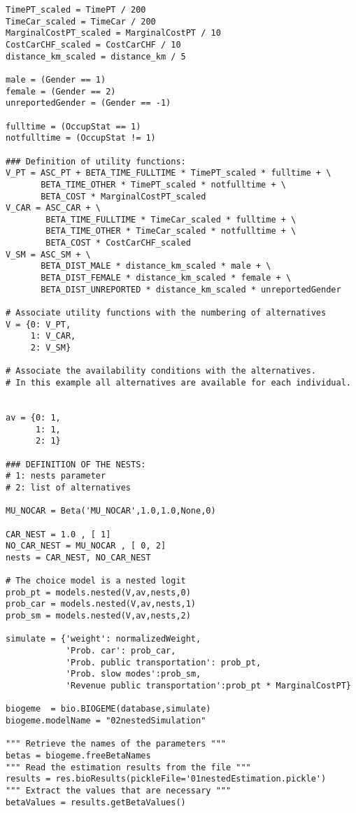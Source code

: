 \documentclass[12pt,a4paper]{article}
\begin{document}
\begin{lstlisting}[style=numbers]
TimePT_scaled = TimePT / 200
TimeCar_scaled = TimeCar / 200
MarginalCostPT_scaled = MarginalCostPT / 10
CostCarCHF_scaled = CostCarCHF / 10
distance_km_scaled = distance_km / 5

male = (Gender == 1)
female = (Gender == 2)
unreportedGender = (Gender == -1)

fulltime = (OccupStat == 1)
notfulltime = (OccupStat != 1)

### Definition of utility functions:
V_PT = ASC_PT + BETA_TIME_FULLTIME * TimePT_scaled * fulltime + \
       BETA_TIME_OTHER * TimePT_scaled * notfulltime + \
       BETA_COST * MarginalCostPT_scaled
V_CAR = ASC_CAR + \
        BETA_TIME_FULLTIME * TimeCar_scaled * fulltime + \
        BETA_TIME_OTHER * TimeCar_scaled * notfulltime + \
        BETA_COST * CostCarCHF_scaled
V_SM = ASC_SM + \
       BETA_DIST_MALE * distance_km_scaled * male + \
       BETA_DIST_FEMALE * distance_km_scaled * female + \
       BETA_DIST_UNREPORTED * distance_km_scaled * unreportedGender

# Associate utility functions with the numbering of alternatives
V = {0: V_PT,
     1: V_CAR,
     2: V_SM}

# Associate the availability conditions with the alternatives.
# In this example all alternatives are available for each individual.


av = {0: 1,
      1: 1,
      2: 1}

### DEFINITION OF THE NESTS:
# 1: nests parameter
# 2: list of alternatives

MU_NOCAR = Beta('MU_NOCAR',1.0,1.0,None,0)

CAR_NEST = 1.0 , [ 1]
NO_CAR_NEST = MU_NOCAR , [ 0, 2]
nests = CAR_NEST, NO_CAR_NEST

# The choice model is a nested logit
prob_pt = models.nested(V,av,nests,0)
prob_car = models.nested(V,av,nests,1)
prob_sm = models.nested(V,av,nests,2)

simulate = {'weight': normalizedWeight,
            'Prob. car': prob_car,
            'Prob. public transportation': prob_pt,
            'Prob. slow modes':prob_sm,
            'Revenue public transportation':prob_pt * MarginalCostPT}

biogeme  = bio.BIOGEME(database,simulate)
biogeme.modelName = "02nestedSimulation"

""" Retrieve the names of the parameters """
betas = biogeme.freeBetaNames
""" Read the estimation results from the file """
results = res.bioResults(pickleFile='01nestedEstimation.pickle')
""" Extract the values that are necessary """
betaValues = results.getBetaValues()




\end{lstlisting}
\end{document}

